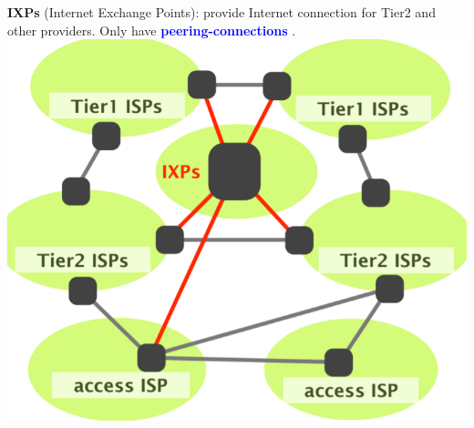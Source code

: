 \documentclass[a4paper, fontsize=8pt, landscape, DIV=1]{scrartcl}
\begin{document}
\begin{multicols*}{4}
				\textbf{IXPs} (Internet Exchange Points): provide Internet connection for Tier2 and other providers. Only have \textcolor{Blue}{\textbf{peering-connections}} . 
				\includegraphics[width=\columnwidth]{images/Overview/IXPs.png}

\end{multicols*}
\end{document}

